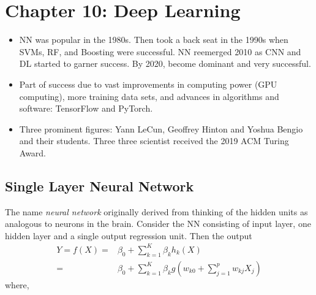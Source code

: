 \documentclass[
  letterpaper,
  DIV=11,
  numbers=noendperiod]{scrreprt}
\begin{document}

\chapter{Chapter 10: Deep Learning}\label{chapter-10-deep-learning}

\begin{itemize}
\item
  NN was popular in the 1980s. Then took a back seat in the 1990s when
  SVMs, RF, and Boosting were successful. NN reemerged 2010 as CNN and
  DL started to garner success. By 2020, become dominant and very
  successful.
\item
  Part of success due to vast improvements in computing power (GPU
  computing), more training data sets, and advances in algorithms and
  software: TensorFlow and PyTorch.
\item
  Three prominent figures: Yann LeCun, Geoffrey Hinton and Yoshua Bengio
  and their students. Three three scientist received the 2019 ACM Turing
  Award.
\end{itemize}

\section{Single Layer Neural Network}\label{single-layer-neural-network}

The name \emph{neural network} originally derived from thinking of the
hidden units as analogous to neurons in the brain. Consider the NN
consisting of input layer, one hidden layer and a single output
regression unit. Then the output \begin{align}
Y=f(X)   = & \beta_0 +\sum_{k=1}^K\beta_k h_k(X) \\
  = & \beta_0+ \sum_{k=1}^K \beta_k g(w_{k0}+\sum_{j=1}^p w_{kj}X_j)
\end{align} where,
\end{document}
